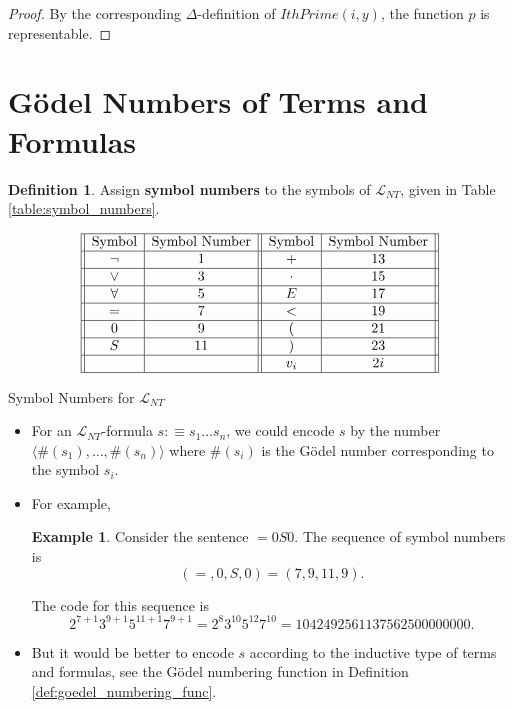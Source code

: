 \documentclass[11pt,letterpaper]{book}
\theoremstyle{definition}
\newtheorem{definition}{Definition}[section]
\newtheorem{example}{Example}[section]
\begin{document}
\begin{proof}

By the corresponding $\Delta$-definition of $IthPrime(i, y)$, the function $p$ is representable.

\end{proof}



\section{G\"odel Numbers of Terms and Formulas}


\begin{definition}
\label{def:goedel_symbol_numbers}
Assign \textbf{symbol numbers} to the symbols of $\mathcal{L}_{NT}$, given in Table \ref{table:symbol_numbers}.
\begin{table}[h]

\begin{equation}
\begin{array}{||c|c||c|c||}
\hline
\text{Symbol} & \text{Symbol Number} & \text{Symbol} & \text{Symbol
Number} \\
\hline
\lnot & 1 & + & 13 \\
\hline
\lor & 3 & \cdot & 15 \\
\hline
\forall & 5 & E & 17 \\
\hline
= & 7 & < & 19 \\ \hline
0 & 9 & ( & 21 \\ \hline
S & 11 & ) & 23 \\ \hline
    & & v_i & 2i \\
\hline
\end{array}\nonumber
\end{equation}
\caption{Symbol Numbers for $\mathcal{L}_{NT}$}\label{table:symbol_numbers}
\end{table}

\end{definition}


\begin{itemize}
\item{For an $\mathcal{L}_{NT}$-formula $s :\equiv s_1 \ldots s_n $, we could encode $s$ by the number $\langle \# (s_1), \ldots, \# (s_n) \rangle $ where $\# (s_i)$ is the G\"odel number corresponding to the symbol $s_i$.}
\item{For example,
\begin{example}
Consider the sentence $=0S0$. The sequence of symbol numbers is $$ (=,
0, S, 0) = (7, 9, 11, 9).$$

The code for this sequence is $$ 2^{7+1} 3^{9+1} 5^{11+1} 7^{9+1} = 2^8
3^{10} 5^{12} 7^{10} = 1042492561137562500000000. $$
\end{example}
}
\item{But it would be better to encode $s$ according to the inductive type of terms and formulas, see the G\"odel numbering function in Definition \ref{def:goedel_numbering_func}.}
\end{itemize}
\end{document}
